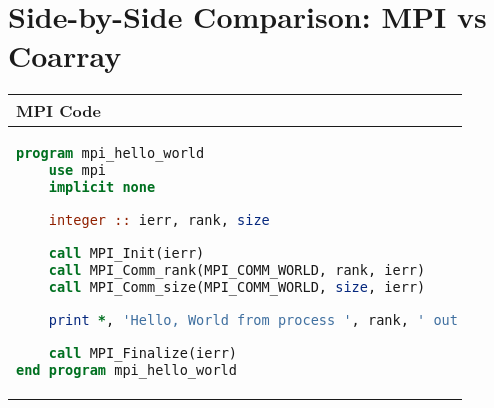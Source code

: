 % 


\newcommand{\alignedcodes}[2]{%
\begin{tabular}{@{}>{\ttfamily\footnotesize\raggedright}p{0.45\linewidth}@{\hspace{1em}}>{\ttfamily\footnotesize\raggedright}p{0.45\linewidth}@{}}
\hline
\textbf{MPI Code} & \textbf{Coarray Code} \\
\hline
\begin{lstlisting}[language=Fortran]
program mpi_hello_world
    use mpi
    implicit none

    integer :: ierr, rank, size

    call MPI_Init(ierr)
    call MPI_Comm_rank(MPI_COMM_WORLD, rank, ierr)
    call MPI_Comm_size(MPI_COMM_WORLD, size, ierr)

    print *, 'Hello, World from process ', rank, ' out of ', size

    call MPI_Finalize(ierr)
end program mpi_hello_world
\end{lstlisting} &
\begin{lstlisting}[language=Fortran]
program coarray_hello_world
    implicit none

    integer :: num_images, my_image

    num_images = num_images()
    my_image = this_image()

    print *, 'Hello, World from image ', my_image, ' out of ', num_images
end program coarray_hello_world
\end{lstlisting} \\
\hline
\end{tabular}
}


\section*{Side-by-Side Comparison: MPI vs Coarray}

\alignedcodes{}{}


\endinput  %

